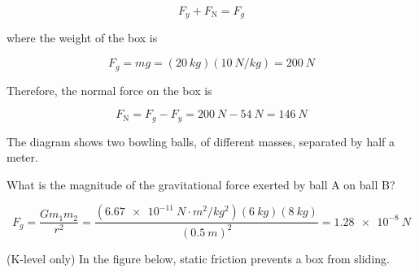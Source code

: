 \documentclass[answers]{exam}
\begin{document}
\begin{questions}
\begin{solution}
\begin{equation*}
    F_y + F_\mathrm{N} = F_g
\end{equation*}

where the weight of the box is

\begin{equation*}
    F_g = mg = (\SI{20}{kg})(\SI{10}{N/kg}) = \SI{200}{N}
\end{equation*}

Therefore, the normal force on the box is

\begin{equation*}
    F_\mathrm{N} = F_g - F_y = \SI{200}{N} - \SI{54}{N} = \boxed{\SI{146}{N}}
\end{equation*}
\end{solution}

\question
The diagram shows two bowling balls, of different masses, separated by half a meter. 

\begin{center}
\end{center}

What is the magnitude of the gravitational force exerted by ball A on ball B?

\begin{solutionorbox}[3cm]
\begin{equation*}
    F_g = \frac{G m_1 m_2}{r^2} = \frac{\left(\SI{6.67e-11}{N\cdot m^2/kg^2}\right)(\SI{6}{kg})(\SI{8}{kg})}{(\SI{0.5}{m})^2} = \boxed{\SI{1.28e-8}{N}}
\end{equation*}
\end{solutionorbox}


\question
(K-level only) In the figure below, static friction prevents a box from sliding.

\begin{center}
\end{center}


\end{questions}
\end{document}
